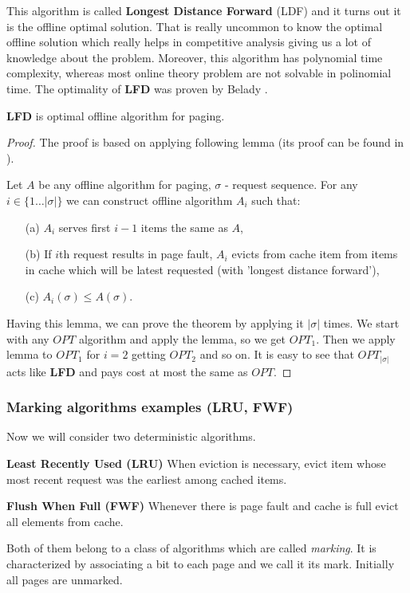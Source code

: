 This algorithm is called \textbf{Longest Distance Forward} (LDF) and it turns 
out it is the offline optimal solution. That is really uncommon to know the 
optimal offline solution which really helps in competitive analysis giving us 
a lot of knowledge about the problem. Moreover, this algorithm has polynomial 
time complexity, whereas most online theory problem are not solvable in 
polinomial time. The optimality of \textbf{LFD} was proven by Belady 
\cite{LFDBelady}.
\begin{theorem} 
 \textbf{LFD} is optimal offline algorithm for paging.
\end{theorem}
\begin{proof}
 The proof is based on applying following lemma (its proof can be found in 
\cite{czarodziej}).
\begin{lemma}
Let $A$ be any offline algorithm for paging, $\sigma$ - request sequence. For 
any $i \in \{1 \ldots |\sigma|\}$ we can construct offline algorithm $A_i$ such 
that:
\begin{itemize}
 \item[(a)] $A_i$ serves first $i-1$ items the same as $A$,
 \item[(b)] If $i$th request results in page fault, $A_i$ evicts from cache 
item from items in cache which will be latest requested (with 'longest distance 
forward'),
  \item[(c)] $A_i(\sigma) \leq A(\sigma)$.
\end{itemize}
\end{lemma}
Having this lemma, we can prove the theorem by applying it $|\sigma|$ times. 
We start with any $OPT$ algorithm and apply the lemma, so we get $OPT_1$. Then 
we apply lemma to $OPT_1$ for $i=2$ getting $OPT_2$ and so on. It is easy to 
see that $OPT_{|\sigma|}$ acts like \textbf{LFD} and pays cost at most the 
same 
as $OPT$.
\end{proof}

\subsubsection{Marking algorithms examples (LRU, FWF)}
Now we will consider two deterministic algorithms.
\begin{myalgo}
 \textbf{Least Recently Used (LRU)}
 \newline
When eviction is necessary, evict item whose most recent request was the 
earliest among cached items.
\end{myalgo}
\begin{myalgo}
  \textbf{Flush When Full (FWF)}
  \newline
Whenever there is page fault and cache is full evict all elements from cache.
\end{myalgo}
Both of them belong to a class of algorithms which are called \textit{marking}. 
It is characterized by associating a bit to each page and we call 
it its mark. Initially all pages are unmarked. 

